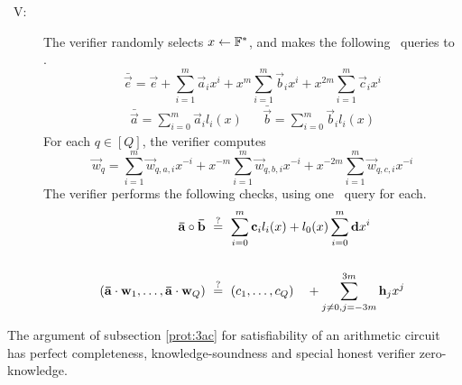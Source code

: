 \begin{description}
\item[\ V:] The verifier randomly selects $x\gets \mathbb{F}^*$, and makes the following \ILCopen\ queries to \ILC.
\[
\bar{\vec{e}} = \vec{e} + \sum_{i=1}^m \vec{a}_{i} x^i + x^m \sum_{i=1}^m \vec{b}_{i} x^i + x^{2m} \sum_{i=1}^m \vec{c}_{i} x^i
\]
\begin{align*}
\bar{\vec{a}} = \sum_{i=0}^m \vec{a}_{i} l_i(x) && \bar{\vec{b}} = \sum_{i=0}^m \vec{b}_{i} l_i(x)
\end{align*}
For each $q \in [Q]$, the verifier computes
\[
\vec{w}_q = \sum_{i=1}^m \vec{w}_{q,a,i} x^{-i} + x^{-m} \sum_{i=1}^m \vec{w}_{q,b,i} x^{-i} + x^{-2m} \sum_{i=1}^m \vec{w}_{q,c,i} x^{-i}
\]
The verifier performs the following checks, using one \ILCcheck\ query for each.
\begin{align*}
\mathbf{\bar{a}} \circ \mathbf{\bar{b}} ~&\overset{?}{=}~ \sum_{i=0}^m \mathbf{c}_{i} l_i(x) + l_0(x) \sum_{i=0}^m \mathbf{d} x^i \\ \\
\left(\mathbf{\bar{a}}\cdot \mathbf{w}_1,\ldots,\mathbf{\bar{a}}\cdot \mathbf{w}_Q \right) ~&\overset{?}{=}~ (c_1,\ldots,c_Q) \quad + \sum_{j\neq 0,j=-3m}^{3m} \mathbf{h}_j {x^j}
\end{align*}
\end{description}

\begin{thm}
The argument of subsection \ref{prot:3ac} for satisfiability of an arithmetic circuit has perfect completeness, knowledge-soundness and special honest verifier zero-knowledge.
\end{thm}


